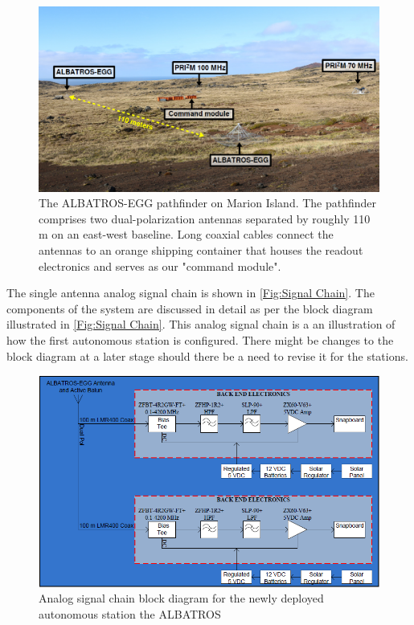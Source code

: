 \documentclass{ws-jai}
\begin{document}
	\begin{figure}[h]
		\begin{center}
			\includegraphics[width=0.7\linewidth]{Figures/ALBATROS-EGG.PNG}
			\caption{The ALBATROS-EGG pathfinder on Marion Island. The pathfinder comprises two dual-polarization antennas separated by roughly 110 m on an east-west baseline. Long coaxial cables connect the antennas to	an orange shipping container that houses the readout electronics and serves as our "command module".}
			\label{Fig:ALBATROS-EGG}
		\end{center}
	\end{figure}


The single antenna analog signal chain is shown in \autoref{Fig:Signal Chain}. The components of the system are discussed in detail as per the block diagram illustrated in \autoref{Fig:Signal Chain}. This analog signal chain is a an illustration of how the first autonomous station is configured. There might be changes to the block diagram at a later stage should there be a need to revise it for the stations.

\begin{figure}[h]
	\begin{center}
		\includegraphics[width=1.0\linewidth]{Figures/Signal-Chain.png}
		\caption{Analog signal chain block diagram for the newly deployed autonomous station the ALBATROS}
		\label{Fig:Signal Chain}
	\end{center}
\end{figure}
\end{document}
